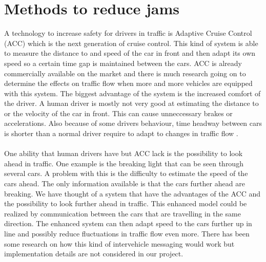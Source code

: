 \section{Methods to reduce jams}
A technology to increase safety for drivers in traffic is Adaptive Cruise
Control (ACC) which is the next generation of cruise control. This kind of
system is able to measure the distance to and speed of the car in front and then
adapt its own speed so a certain time gap is maintained between the cars. ACC
is already commercially available on the market and there is much research
going on to determine the effects on traffic flow when more and more vehicles are
equipped with this system. The biggest advantage of the system
is the increased comfort of the driver. A human
driver is mostly not very good at estimating the distance to or the velocity of the car
in front. This can cause unneccessary brakes or accelerations. Also because of
some drivers behaviour, time headway between cars is shorter than a normal
driver require to adapt to changes in traffic flow \cite{acc}.\\\\

One ability that human drivers have but ACC lack is the possibility to look
ahead in traffic. One example is the breaking light that can be seen through
several cars. 
 A problem with this is the difficulty to estimate the speed of the
cars ahead. The only information available is that the cars further ahead are
breaking. We have thought of a system that have the advantages of the ACC and
the possibility to look further ahead in traffic. This enhanced model could
be realized by communication between the cars that are travelling in the same
direction. The enhanced system can then adapt speed to the cars further up in line and possibly reduce fluctuations in traffic flow even more. There has been some research on how this kind of intervehicle messaging would work  \cite{communication} but implementation details are not considered in our project.
